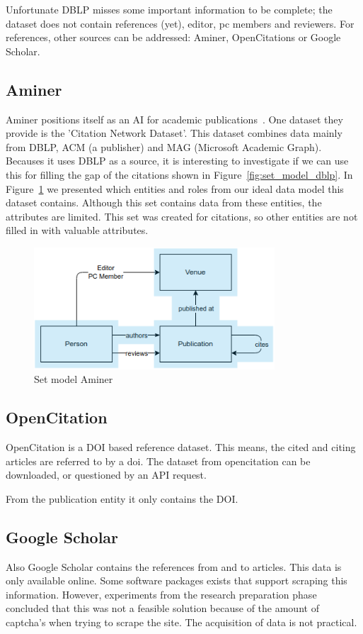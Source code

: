 \documentclass{ou-report}
\begin{document}
Unfortunate DBLP misses some important information to be complete; the dataset
does not contain references (yet), editor, pc members and reviewers. For 
references, other sources can be addressed: Aminer, OpenCitations or Google 
Scholar.

\subsection{Aminer}
Aminer positions itself as an AI for academic publications~\cite{Tang:08KDD}. 
One dataset they provide is the 
'Citation Network Dataset'. This dataset combines data mainly from DBLP, ACM (a 
publisher) and MAG (Microsoft Academic Graph). Becauses it uses DBLP as a 
source, it is interesting to 
investigate if we can use this for filling the gap of the citations shown in 
Figure~\ref{fig:set_model_dblp}.
In Figure~\ref{fig:set_model_aminer} we presented which entities and roles
from our ideal data model this dataset contains. Although this set contains data
from these entities, the attributes are limited. This set was created for
citations, so other entities are not filled in with valuable attributes.
\begin{figure}[H]
\includegraphics[width=9cm]{images/set_model_aminer.png}
\centering
\caption{Set model Aminer}
\label{fig:set_model_aminer}
\end{figure}


\subsection{OpenCitation} 
OpenCitation is a DOI based reference dataset. This means, the cited and citing 
articles are referred to by a doi. 
The dataset from opencitation can be downloaded, or questioned by an API request. 

From the publication entity it only contains the DOI.


\subsection{Google Scholar}
\label{subsec:google_scholar}
Also Google Scholar contains the references from and to articles. This data is 
only available online. Some software packages exists that support scraping this
information. However, experiments from the research preparation phase concluded
that this was not a feasible solution because of the amount of captcha's when
trying to scrape the site. The acquisition of data is not practical.
\end{document}
